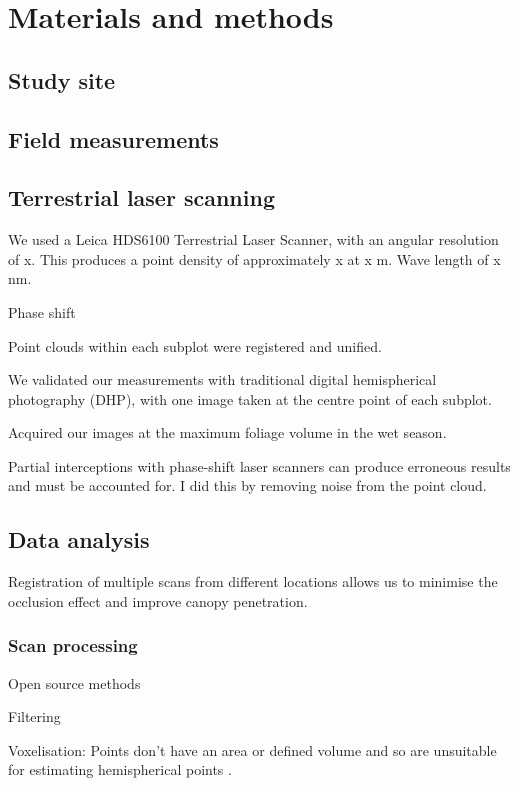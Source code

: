 \documentclass[11pt,a4paper]{article}
\begin{document}
\section{Materials and methods}

\subsection{Study site}

\subsection{Field measurements}

\subsection{Terrestrial laser scanning}

We used a Leica HDS6100 Terrestrial Laser Scanner, with an angular resolution of
x. This produces a point density of approximately x at x m. Wave length of x nm.

Phase shift

Point clouds within each subplot were registered and unified.

We validated our measurements with traditional digital hemispherical photography
(DHP), with one image taken at the centre point of each subplot.

Acquired our images at the maximum foliage volume in the wet season.

Partial interceptions with phase-shift laser scanners can produce erroneous results and must be accounted for. I did this by removing noise from the point cloud.

\subsection{Data analysis}

Registration of multiple scans from different locations allows us to minimise
the occlusion effect and improve canopy penetration.

\subsubsection{Scan processing}

Open source methods

Filtering

Voxelisation: Points don't have an area or defined volume and so are unsuitable
for estimating hemispherical points \citep{Seidel2012}.
\end{document}
